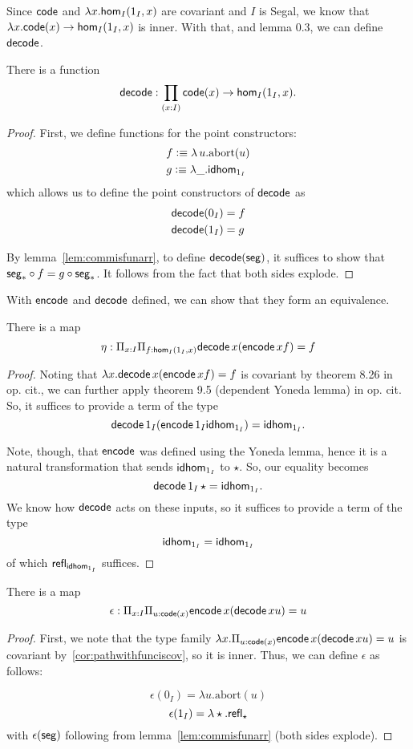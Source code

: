 \documentclass[main.tex]{subfiles}
\begin{document}
Since $\co$ and $\lambda x. \ho[I]{1_I}{x}$ are covariant and $I$ is Segal, we know that $\lambda x. \co(x) \to \ho[I]{1_I}{x}$ is inner. With that, and lemma 0.3, we can define $\dco$.
\begin{lemma}
    There is a function $$\dco : \prod_{(x:I)}\co(x) \to \ho[I]{1_I}{x}.$$
\end{lemma}
\begin{proof}
First, we define functions for the point constructors:
\begin{align*}
    &f \defeq \lambda\, u. \text{abort}(u)\\
    &g \defeq \lambda \_ . \idhom{1_I}
\end{align*}
which allows us to define the point constructors of $\dco$ as
\begin{align*}
    &\dco(0_I) = f\\
    &\dco(1_I) = g\\
\end{align*}

By lemma~\ref{lem:commisfunarr}, to define $\dco(\seg)$, it suffices to show that $\seg_*\circ f = g \circ \seg_*$. 
It follows from the fact that both sides explode.
\end{proof}

With $\eco$ and $\dco$ defined, we can show that they form an equivalence.

\begin{lemma}
    There is a map 
    $$ \eta : \Pi_{x : I} \Pi_{f : \ho[I]{1_I}{x}} \normalfont \dco \, x (\eco \, x f) = f$$
\end{lemma}
\begin{proof}
Noting that $\lambda x .\dco \, x (\eco \, x f) = f$ is covariant by theorem 8.26 in op. cit., we can further apply theorem 9.5 (dependent Yoneda lemma) in op. cit. So, it suffices to provide a term of the type
$$\dco \, 1_I (\eco \, 1_I \idhom{1_I}) = \idhom{1_I}.$$

Note, though, that $\eco$ was defined using the Yoneda lemma, hence it is a natural transformation that sends $\idhom{1_I}$ to $\star$. So, our equality becomes $$
\dco \, 1_I \, \star = \idhom{1_I}.$$ We know how $\dco$ acts on these inputs, so it suffices to provide a term of the type
$$\idhom{1_I} = \idhom{1_I}$$
of which $\refl{\idhom{1_I}}$ suffices.
\end{proof}

\begin{lemma}
    There is a map 
    $$ \epsilon : \Pi_{x : I} \Pi_{u : \co(x)} \normalfont \eco \, x (\dco \, x u) = u$$
\end{lemma}
\begin{proof}
First, we note that the type family $\lambda x.\Pi_{u : \co(x)} \normalfont \eco \, x (\dco \, x u) = u $ is covariant by~\ref{cor:pathwithfunciscov}, so it is inner.
Thus, we can define $\epsilon$ as follows:

$$\epsilon(0_I) = \lambda u. \text{abort}(u)$$
$$\epsilon(1_I) = \lambda \star. \refl{\star}$$
with $\epsilon(\seg)$ following from lemma~\ref{lem:commisfunarr} (both sides explode).
\end{proof}
\end{document}
